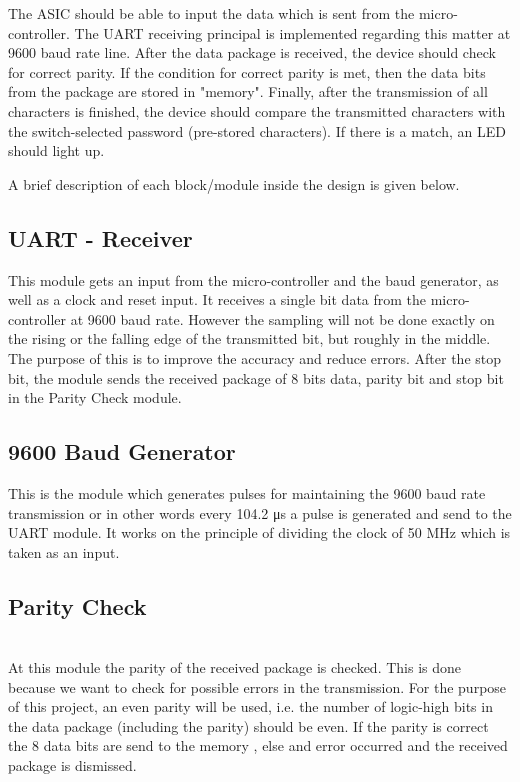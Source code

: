 \documentclass[a4paper, twoside]{report}
\begin{document}
\noindent The ASIC should be able to input the data which is sent from the micro-controller. The UART receiving principal is implemented regarding this matter at 9600 baud rate line. After the data package is received, the device should check for correct parity. If the condition for correct parity is met, then the data bits from the package are stored in "memory". Finally, after the transmission of all characters is finished, the device should compare the transmitted characters with the switch-selected password (pre-stored characters). If there is a match, an LED should light up.  \\ \par

\noindent A brief description of each block/module inside the design is given below. \\ \par

\subsection{UART - Receiver}
\noindent This module gets an input from the micro-controller and the baud generator, as well as a clock and reset input. It receives a single bit data from the micro-controller at 9600 baud rate. However the sampling will not be done exactly on the rising or the falling edge of the transmitted bit, but roughly in the middle. The purpose of this is to improve the accuracy and reduce errors. After the stop bit, the module sends the received package of 8 bits data, parity bit and stop bit in the Parity Check module. \\ \par
\subsection{9600 Baud Generator}
\noindent This is the module which generates pulses for maintaining the 9600 baud rate transmission or in other words every 104.2 \si{\micro\second} a pulse is generated and send to the UART module. It works on the principle of dividing the clock of 50 \si{\mega\hertz} which is taken as an input.\\ \par
\subsection{Parity Check}
\noindent \\ At this module the parity of the received package is checked. This is done because we want to check for possible errors in the transmission. For the purpose of this project, an even parity will be used, i.e. the number of logic-high bits in the data package (including the parity) should be even. If the parity is correct the 8 data bits are send to the memory , else and error occurred and the received package is dismissed.\\ \par
\end{document}
